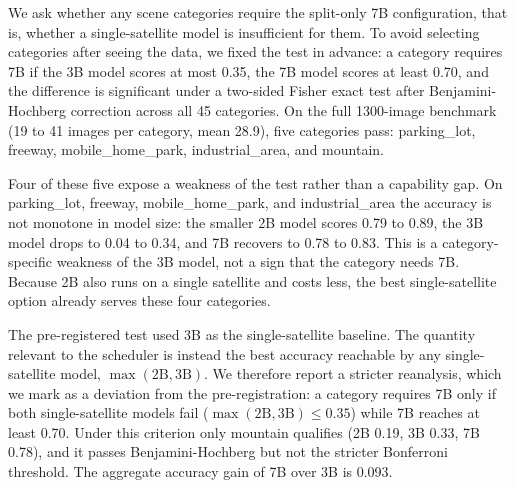 
We ask whether any scene categories require the split-only 7B configuration,
that is, whether a single-satellite model is insufficient for them. To avoid
selecting categories after seeing the data, we fixed the test in advance: a
category requires 7B if the 3B model scores at most 0.35, the 7B model scores
at least 0.70, and the difference is significant under a two-sided Fisher exact
test after Benjamini-Hochberg correction across all 45 categories. On the full
1300-image benchmark (19 to 41 images per category, mean 28.9), five categories
pass: parking\_lot, freeway, mobile\_home\_park, industrial\_area, and mountain.

Four of these five expose a weakness of the test rather than a capability gap.
On parking\_lot, freeway, mobile\_home\_park, and industrial\_area the accuracy
is not monotone in model size: the smaller 2B model scores 0.79 to 0.89, the 3B
model drops to 0.04 to 0.34, and 7B recovers to 0.78 to 0.83. This is a
category-specific weakness of the 3B model, not a sign that the category needs
7B. Because 2B also runs on a single satellite and costs less, the best
single-satellite option already serves these four categories.

The pre-registered test used 3B as the single-satellite baseline. The quantity
relevant to the scheduler is instead the best accuracy reachable by any
single-satellite model, $\max(\text{2B},\text{3B})$. We therefore report a
stricter reanalysis, which we mark as a deviation from the pre-registration: a
category requires 7B only if both single-satellite models fail
($\max(\text{2B},\text{3B})\le 0.35$) while 7B reaches at least 0.70. Under this
criterion only mountain qualifies (2B 0.19, 3B 0.33, 7B 0.78), and it passes
Benjamini-Hochberg but not the stricter Bonferroni threshold. The aggregate
accuracy gain of 7B over 3B is 0.093.

